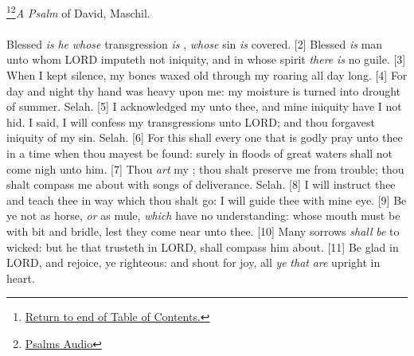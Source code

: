 \footnote{\textcolor[cmyk]{0.99998,1,0,0}{\hyperlink{TOC}{Return to end of Table of Contents.}}}\footnote{\href{https://www.audioverse.org/english/audiobibles/books/ENGKJV/O/Ps/1}{\textcolor[cmyk]{0.99998,1,0,0}{Psalms Audio}}}\textcolor[cmyk]{0.99998,1,0,0}{\emph{A Psalm} of David, Maschil.}\\
\\
\textcolor[cmyk]{0.99998,1,0,0}{Blessed \emph{is} \emph{he} \emph{whose} transgression \emph{is} , \emph{whose} sin \emph{is} covered.}
[2] \textcolor[cmyk]{0.99998,1,0,0}{Blessed \emph{is}  man unto whom  LORD imputeth not iniquity, and in whose spirit \emph{there} \emph{is} no guile.}
[3] \textcolor[cmyk]{0.99998,1,0,0}{When I kept silence, my bones waxed old through my roaring all  day long.}
[4] \textcolor[cmyk]{0.99998,1,0,0}{For day and night thy hand was heavy upon me: my moisture is turned into  drought of summer. Selah.}
[5] \textcolor[cmyk]{0.99998,1,0,0}{I acknowledged my  unto thee, and mine iniquity have I not hid. I said, I will confess my transgressions unto  LORD; and thou forgavest  iniquity of my sin. Selah.}
[6] \textcolor[cmyk]{0.99998,1,0,0}{For this shall every one that is godly pray unto thee in a time when thou mayest be found: surely in  floods of great waters  shall not come nigh unto him.}
[7] \textcolor[cmyk]{0.99998,1,0,0}{Thou \emph{art} my ; thou shalt preserve me from trouble; thou shalt compass me about with songs of deliverance. Selah.}
[8] \textcolor[cmyk]{0.99998,1,0,0}{I will instruct thee and teach thee in  way which thou shalt go: I will guide thee with mine eye.}
[9] \textcolor[cmyk]{0.99998,1,0,0}{Be ye not as  horse, \emph{or} as  mule, \emph{which} have no understanding: whose mouth must be  with bit and bridle, lest they come near unto thee.}
[10] \textcolor[cmyk]{0.99998,1,0,0}{Many sorrows \emph{shall} \emph{be} to  wicked: but he that trusteth in  LORD,  shall compass him about.}
[11] \textcolor[cmyk]{0.99998,1,0,0}{Be glad in  LORD, and rejoice, ye righteous: and shout for joy, all \emph{ye} \emph{that} \emph{are} upright in heart.}